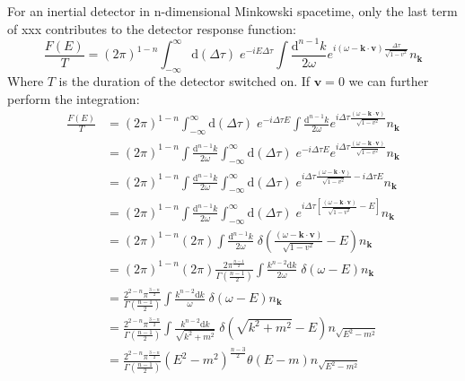 \documentclass[12pt]{article}
\numberwithin{equation}{subsection}
\theoremstyle{mystyle}{\newtheorem{definition}{Definition}[subsection]}
\theoremstyle{mystyle}{\newtheorem{theorem}[definition]{Theorem}}
\theoremstyle{mystyle}{\newtheorem*{remark}{Remark}}
\theoremstyle{mystyle}{\newtheorem{example}{Example}[subsection]}
\theoremstyle{mystyle}{\newtheorem{examples}{Examples}[subsection]}
\theoremstyle{mystyle}{\newtheorem{cthm}{}[subsection]}
\newcommand{\id}{\mathrm{d}}
\begin{document}
For an inertial detector in n-dimensional Minkowski spacetime, only the last term of xxx contributes to the detector response function:
\begin{equation}
  \frac{F(E)}{T}=(2\pi)^{1-n}\int^{\infty}_{-\infty}\id (\Delta \tau)\;e^{-iE\Delta\tau}
  \int\frac{\id^{n-1}k}{2\omega}e^{i(\omega-\mathbf{k}\cdot\mathbf{v})\frac{\Delta\tau}{\sqrt{1-v^2}}}n_{\mathbf{k}}
\end{equation}
Where \(T\) is the duration of the detector switched on. If \(\mathbf{v}=0\) we can further perform the integration:
\begin{align}
  \frac{F(E)}{T} & = (2\pi)^{1-n}\int^{\infty}_{-\infty}\id (\Delta \tau)\;e^{-i\Delta\tau E}
  \int\frac{\id^{n-1}k}{2\omega}e^{i\Delta\tau\frac{(\omega-\mathbf{k}\cdot\mathbf{v})}{\sqrt{1-v^2}}}n_{\mathbf{k}}        \\
                 & = (2\pi)^{1-n}\int\frac{\id^{n-1}k}{2\omega}\int^{\infty}_{-\infty}\id (\Delta \tau)\;e^{-i\Delta\tau E}
  e^{i\Delta\tau\frac{(\omega-\mathbf{k}\cdot\mathbf{v})}{\sqrt{1-v^2}}}n_{\mathbf{k}}                                      \\
                 & = (2\pi)^{1-n}\int\frac{\id^{n-1}k}{2\omega}\int^{\infty}_{-\infty}\id (\Delta \tau)\;
  e^{i\Delta\tau\frac{(\omega-\mathbf{k}\cdot\mathbf{v})}{\sqrt{1-v^2}}-i\Delta\tau E}n_{\mathbf{k}}                        \\
                 & = (2\pi)^{1-n}\int\frac{\id^{n-1}k}{2\omega}\int^{\infty}_{-\infty}\id (\Delta \tau)\;
  e^{i\Delta\tau\left[\frac{(\omega-\mathbf{k}\cdot\mathbf{v})}{\sqrt{1-v^2}}-E\right]}n_{\mathbf{k}}                       \\
                 & = (2\pi)^{1-n}(2\pi)\int\frac{\id^{n-1}k}{2\omega}\;
  \delta\left(\frac{(\omega-\mathbf{k}\cdot\mathbf{v})}{\sqrt{1-v^2}}-E\right)n_{\mathbf{k}}                                \\
                 & = (2\pi)^{1-n}(2\pi)\frac{2\pi^{\frac{n-1}{2}}}{\Gamma(\frac{n-1}{2})}\int\frac{k^{n-2}\id k}{2\omega}\;
  \delta\left(\omega-E\right)n_{\mathbf{k}}                                                                                 \\
                 & = \frac{2^{2-n}\pi^{\frac{3-n}{2}}}{\Gamma(\frac{n-1}{2})}\int\frac{k^{n-2}\id k}{\omega}\;
  \delta\left(\omega-E\right)n_{\mathbf{k}}                                                                                 \\
                 & = \frac{2^{2-n}\pi^{\frac{3-n}{2}}}{\Gamma(\frac{n-1}{2})}\int\frac{k^{n-2}\id k}{\sqrt{k^2+m^2}}\;
  \delta\left(\sqrt{k^2+m^2}-E\right)n_{\sqrt{E^2-m^2}}                                                                     \\
                 & = \frac{2^{2-n}\pi^{\frac{3-n}{2}}}{\Gamma(\frac{n-1}{2})}\left(E^2-m^2\right)^{\frac{n-3}{2}}
  \theta\left(E-m\right)n_{\sqrt{E^2-m^2}}
\end{align}
\end{document}
